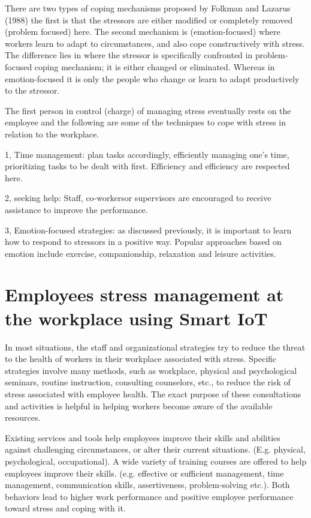 There are two types of coping mechanisms proposed by Folkman and Lazarus (1988) the first is that the stressors are either modified or completely removed (problem focused) here. The second mechanism is (emotion-focused) where workers learn to adapt to circumstances, and also cope constructively with stress.  The difference lies in where the stressor is specifically confronted in problem-focused coping mechanism; it is either changed or eliminated. Whereas in emotion-focused it is only the people who change or learn to adapt productively to the stressor. \citep[p.326]{Bloisi2007ManagementBehaviour}

The first person in control (charge) of managing stress eventually rests on the employee and the following are some of the techniques to cope with stress in relation to the workplace.

1, Time management: plan tasks accordingly, efficiently managing one's time, prioritizing tasks to be dealt with first. Efficiency and efficiency are respected here.

2, seeking help: Staff, co-workersor supervisors are encouraged to receive assistance to improve the performance.

3, Emotion-focused strategies: as discussed previously, it is important to learn how to respond to stressors in a positive way. Popular approaches based on emotion include exercise, companionship, relaxation and leisure activities. \citep[p.328-333]{Bloisi2007ManagementBehaviour}

\section{Employees stress management at the workplace using Smart \acs{IoT}}
In most situations, the staff and organizational strategies try to reduce the threat to the health of workers in their workplace associated with stress.  Specific strategies involve many methods, such as workplace, physical and psychological seminars, routine instruction, consulting counselors, etc., to reduce the risk of stress associated with employee health. The exact purpose of these consultations and activities is helpful in helping workers become aware of the available resources.

Existing services and tools help employees improve their skills and abilities against challenging circumstances, or alter their current situations. (E.g. physical, psychological, occupational). A wide variety of training courses are offered to help employees improve their skills.  (e.g. effective or sufficient management, time management, communication skills, assertiveness, problem-solving etc.). Both behaviors lead to higher work performance and positive employee performance toward stress and coping with it. 


